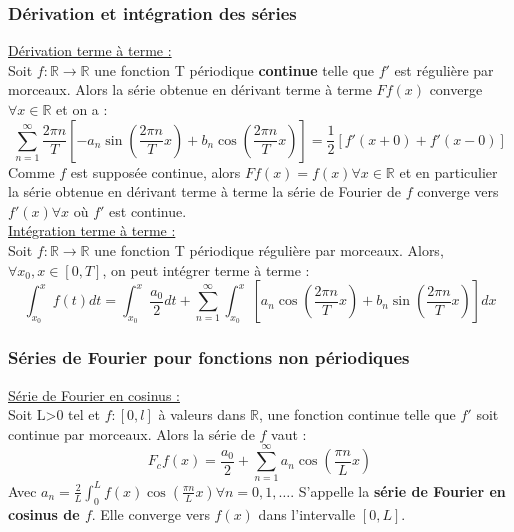 \documentclass[../main.tex]{subfiles}
\begin{document}
\subsubsection{Dérivation et intégration des séries}

\quad \underline{Dérivation terme à terme :}\\
Soit $f:\mathbb{R} \rightarrow \mathbb{R}$ une fonction T périodique \textbf{continue} telle que $f'$ est régulière par morceaux. Alors la série obtenue en dérivant terme à terme $Ff(x)$ converge $\forall x\in \mathbb{R}$ et on a :\\
\begin{equation}
    \sum_{n=1}^{\infty} \frac{2\pi n}{T} [-a_n \sin{(\frac{2\pi n}{T}x)} + b_n \cos{(\frac{2\pi n}{T}x)}] = \frac{1}{2}[f'(x+0) + f'(x-0)]
\end{equation}
Comme $f$ est supposée continue, alors $Ff(x) = f(x) \forall x\in \mathbb{R}$ et en particulier la série obtenue en dérivant terme à terme la série de Fourier de $f$ converge vers $f'(x) \forall x$ où $f'$ est continue.\\

\quad \underline{Intégration terme à terme :}\\
Soit $f:\mathbb{R}\rightarrow \mathbb{R}$ une fonction T périodique régulière par morceaux. Alors, $\forall x_0, x\in [0,T]$, on peut intégrer terme à terme :\\
\begin{equation}
    \int_{x_0}^x f(t) dt = \int_{x_0}^x \frac{a_0}{2}dt + \sum_{n=1}^{\infty} \int_{x_0}^x [a_n \cos{(\frac{2\pi n}{T}x)} + b_n \sin{(\frac{2\pi n}{T}x)}]dx
\end{equation}

\subsubsection{Séries de Fourier pour fonctions non périodiques}
\quad \underline{Série de Fourier en cosinus :}\\
Soit L>0 tel et $f:[0,l]$ à valeurs dans $\mathbb{R}$, une fonction continue telle que $f'$ soit continue par morceaux. Alors la série de $f$ vaut :\\
\begin{equation}
    F_c f(x) = \frac{a_0}{2} + \sum_{n=1}^{\infty} a_n \cos(\frac{\pi n}{L}x)
\end{equation}
Avec $a_n = \frac{2}{L}\int_0^L f(x) \cos(\frac{\pi n}{L}x) \forall n=0,1,\dots$. S'appelle la \textbf{série de Fourier en cosinus de $f$}. Elle converge vers $f(x)$ dans l'intervalle $[0,L]$.\\
\end{document}
